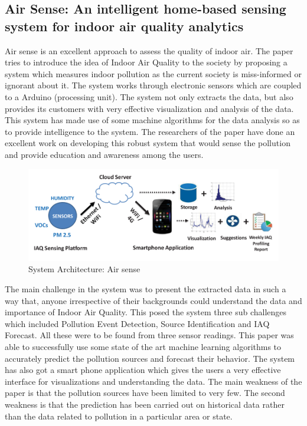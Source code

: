 \documentclass[11pt]{article}
\begin{document}
\subsection{Air Sense: An intelligent home-based sensing system for indoor air quality analytics}

Air sense is an excellent approach to assess the quality of indoor air. The paper tries to introduce the idea of Indoor Air Quality to the society by proposing a system which measures indoor pollution as the current society is miss-informed or ignorant about it. The system works through electronic sensors which are coupled to a Arduino (processing unit). The system not only extracts the data, but also provides its customers with very effective visualization and analysis of the data. This system has made use of some machine algorithms for the data analysis so as to provide intelligence to the system. The researchers of the paper have done an excellent work on developing this robust system that would sense the pollution and provide education and awareness among the users.
\begin{figure}[h!]
  \centering
  \hspace*{-1.25cm}   
\includegraphics[scale=0.34]{images/fig2.png}
  \hspace*{-1.25cm}
  \caption{System Architecture: Air sense}
  \label{arch}
\end{figure}

The main challenge in the system was to present the extracted data in such a way that, anyone irrespective of their backgrounds could understand the data and importance of Indoor Air Quality. This posed the system three sub challenges which included Pollution Event Detection, Source Identification and IAQ Forecast. All these were to be found from three sensor readings. This paper was able to successfully use some state of the art machine learning algorithms to accurately predict the pollution sources and forecast their behavior. The system has also got a smart phone application which gives the users a very effective interface for visualizations and understanding the data.
The main weakness of the paper is that the pollution sources have been limited to very few. The second weakness is that the prediction has been carried out on historical data rather than the data related to pollution in a particular area or state.
\end{document}
